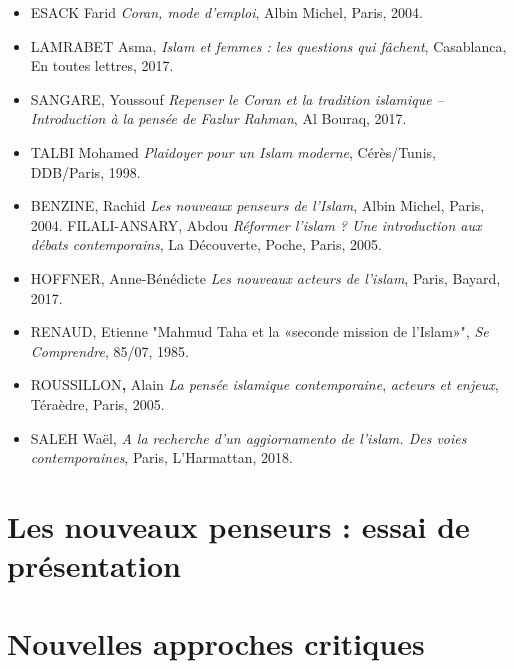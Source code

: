 \begin{itemize}
\item
  
  ESACK Farid \emph{Coran, mode d'emploi}, Albin Michel, Paris, 2004.
  
\item
  
  LAMRABET Asma, \emph{Islam et femmes : les questions qui fâchent},
  Casablanca, En toutes lettres, 2017.
  
\item
  
  SANGARE, Youssouf \emph{Repenser le Coran et la tradition islamique --
  Introduction à la pensée de Fazlur Rahman}, Al Bouraq, 2017.
  
\item

  TALBI Mohamed \emph{Plaidoyer pour un Islam moderne}, Cérès/Tunis,
  DDB/Paris, 1998.
  

\item BENZINE, Rachid \emph{Les nouveaux penseurs de l'Islam}, Albin Michel,
Paris, 2004. FILALI-ANSARY, Abdou \emph{Réformer l'islam ? Une
introduction aux débats contemporains}, La
Découverte, Poche, Paris, 2005.

 \item HOFFNER, Anne-Bénédicte \emph{Les nouveaux acteurs de l'islam}, Paris,
Bayard, 2017.

\item RENAUD, Etienne "Mahmud Taha et la «seconde mission de l'Islam»",
\emph{Se Comprendre}, 85/07, 1985.

\item ROUSSILLON\textbf{,} Alain \emph{La pensée islamique contemporaine},
\emph{acteurs et enjeux}, Téraèdre, Paris, 2005.

\item SALEH Waël, \emph{A la recherche d'un aggiornamento de l'islam. Des
voies contemporaines}, Paris, L'Harmattan, 2018.

\end{itemize}



\section{Les nouveaux penseurs : essai
  de
  présentation}
  
  
\section{Nouvelles approches critiques}

